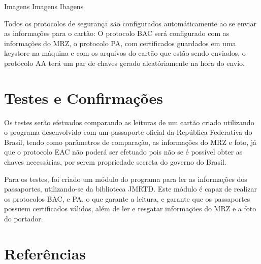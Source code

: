 \documentclass[11pt]{article}
\begin{document}
    	Imagens Imagens Ibagens 
    	
        Todos os protocolos de segurança são configurados automáticamente ao se enviar as informações para o cartão: O protocolo BAC será configurado com as informações do MRZ, o protocolo PA, com certificados guardados em uma keystore na máquina e com os arquivos do cartão que estão sendo enviados, o protocolo AA terá um par de chaves gerado aleatóriamente na hora do envio.
			
			

	\section{Testes e Confirmações}
	
		Os testes serão efetuados comparando as leituras de um cartão criado utilizando o programa desenvolvido com um passaporte oficial da República Federativa do Brasil, tendo como parâmetros de comparação, as informa\-ções do MRZ e foto, já que o protocolo EAC não poderá ser efetuado pois não se é possível obter as chaves necessárias, por serem propriedade secreta do governo do Brasil.
			
		Para os testes, foi criado um módulo do programa para ler as informações dos passaportes, utilizando-se da biblioteca JMRTD. Este módulo é capaz de realizar os protocolos BAC, e PA, o que garante a leitura, e garante que os passaportes possuem certificados válidos, além de ler e resgatar informações do MRZ e a foto do portador.
		
		
			
		

\begingroup
	\section{Referências}
		\renewcommand{\section}[2]{}
		\printbibliography		
		
\endgroup
\end{document}
